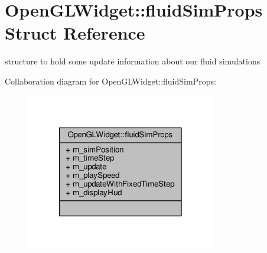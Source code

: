 \hypertarget{struct_open_g_l_widget_1_1fluid_sim_props}{\section{Open\-G\-L\-Widget\-:\-:fluid\-Sim\-Props Struct Reference}
\label{struct_open_g_l_widget_1_1fluid_sim_props}
}


structure to hold some update information about our fluid simulations  




Collaboration diagram for Open\-G\-L\-Widget\-:\-:fluid\-Sim\-Props\-:\nopagebreak
\begin{figure}[H]
\begin{center}
\leavevmode
\includegraphics[width=234pt]{struct_open_g_l_widget_1_1fluid_sim_props__coll__graph}
\end{center}
\end{figure}
